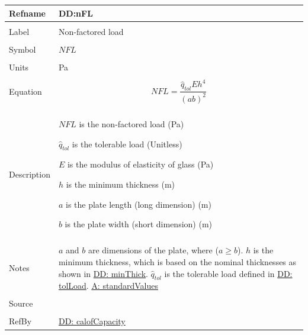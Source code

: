 \documentclass[12pt]{article}
\begin{document}
\noindent \begin{minipage}{\textwidth}
\begin{tabular}{p{} p{}}
\toprule \textbf{Refname} & \textbf{DD:nFL}
\label{DD:nFL}
\\ \midrule \\
Label & Non-factored load
\\ \midrule \\
Symbol & $NFL$
\\ \midrule \\
Units & Pa
\\ \midrule \\
Equation & \begin{displaymath}
           NFL=\frac{{\hat{q}_{tol}} E h^{4}}{\left(a b\right)^{2}}
           \end{displaymath}
\\ \midrule \\
Description & \begin{symbDescription}
              \item{$NFL$ is the non-factored load (Pa)}
              \item{${\hat{q}_{tol}}$ is the tolerable load (Unitless)}
              \item{$E$ is the modulus of elasticity of glass (Pa)}
              \item{$h$ is the minimum thickness (m)}
              \item{$a$ is the plate length (long dimension) (m)}
              \item{$b$ is the plate width (short dimension) (m)}
              \end{symbDescription}
\\ \midrule \\
Notes & $a$ and $b$ are dimensions of the plate, where ($a\geq{}b$).
        $h$ is the minimum thickness, which is based on the nominal thicknesses as shown in \hyperref[DD:minThick]{DD: minThick}.
        ${\hat{q}_{tol}}$ is the tolerable load defined in \hyperref[DD:tolLoad]{DD: tolLoad}.
        \hyperref[assumpSV]{A: standardValues}
\\ \midrule \\
Source & \cite{astm2009}
\\ \midrule \\
RefBy & \hyperref[DD:calofCapacity]{DD: calofCapacity}
\\ \bottomrule \end{tabular}
\end{minipage}
\par~
\end{document}
